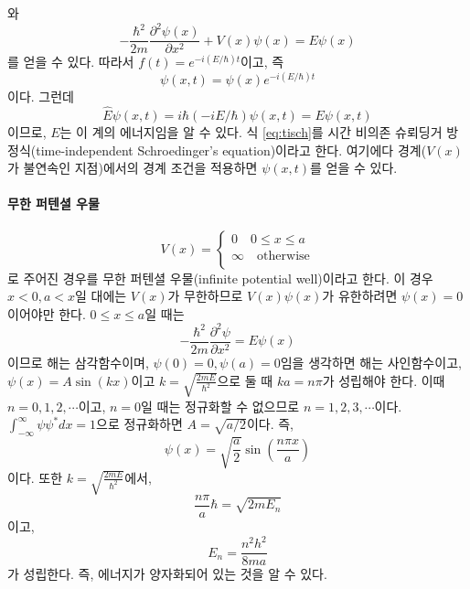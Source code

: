 와
\begin{equation}\label{eq:tisch}
-\frac{\hbar^2}{2m}\frac{\partial^2 \psi(x)}{\partial x^2}+V(x)\psi(x)=E\psi(x)
\end{equation}
를 얻을 수 있다. 따라서 $f(t)=e^{-i(E/\hbar)t}$이고, 즉 
\begin{equation}
\psi(x,t)=\psi(x)e^{-i(E/\hbar)t}
\end{equation}
이다. 그런데
\begin{equation}
\hat{E}\psi(x,t)=i\hbar (-iE/\hbar)\psi(x,t)=E\psi(x,t)
\end{equation}
이므로, $E$는 이 계의 에너지임을 알 수 있다. 식 \ref{eq:tisch}를 시간 비의존 슈뢰딩거 방정식(time-independent Schroedinger's equation)이라고 한다. 여기에다 경계($V(x)$가 불연속인 지점)에서의 경계 조건을 적용하면 $\psi(x,t)$를 얻을 수 있다.
\paragraph{무한 퍼텐셜 우물}
\begin{equation}
V(x)=\begin{cases}
0\quad 0\leq x \leq a \\
\infty\quad \mathrm{otherwise}\\
\end{cases}
\end{equation}
로 주어진 경우를 무한 퍼텐셜 우물(infinite potential well)이라고 한다. 이 경우 $x<0, a<x$일 대에는 $V(x)$가 무한하므로 $V(x)\psi(x)$가 유한하려면 $\psi(x)=0$이어야만 한다. $0\leq x\leq a$일 때는
\begin{equation}
-\frac{\hbar^2}{2m}\frac{\partial^2 \psi}{\partial x^2}=E\psi(x)
\end{equation}
이므로 해는 삼각함수이며, $\psi(0)=0, \psi(a)=0$임을 생각하면 해는 사인함수이고, $\psi(x)=A\sin(kx)$이고 $k=\sqrt{\frac{2mE}{\hbar^2}}$으로 둘 때 $ka=n\pi$가 성립해야 한다. 이때 $n=0,1,2,\cdots$이고, $n=0$일 때는 정규화할 수 없으므로 $n=1,2,3,\cdots$이다. 
$\int_{-\infty}^\infty \psi\psi^*dx=1$으로 정규화하면 $A=\sqrt{a/2}$이다. 즉,
\begin{equation}
\psi(x) = \sqrt{\frac{a}{2}}\sin(\frac{n\pi x}{a})
\end{equation}
이다. 또한 $k=\sqrt{\frac{2mE}{\hbar^2}}$에서,
\begin{equation}
\frac{n\pi}{a}\hbar=\sqrt{2mE_n}
\end{equation}
이고, 
\begin{equation}
E_n = \frac{n^2h^2}{8ma}
\end{equation}
가 성립한다. 즉, 에너지가 양자화되어 있는 것을 알 수 있다. 
